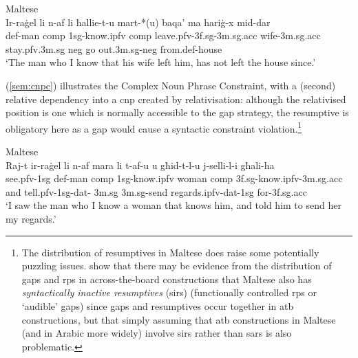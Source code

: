 \documentclass[output=paper,hidelinks]{langscibook}
\begin{document}
\ea \label{wco} Maltese  \citep[19]{CamSad11:LFG} \\
\gll
Ir-ra\.{g}el
       li              n-af               li
ħallie-t-u                  mart-*(u) baqa'        ma     hari\.{g}-x
mid-dar  \\
{\sc def-}man {\sc comp} {\sc 1sg}-know.{\sc ipfv}  {\sc comp}    leave.{\sc pfv}-{\sc 3f.sg-3m.sg.acc}
wife-{\sc 3m.sg.acc}  stay.{\sc pfv}.{\sc 3m.sg} {\sc neg} {go out}.{\sc 3m.sg}-{\sc neg} from.{\sc def}-house\\
\glt `The man who I know that his wife left him, has not left the house since.'
\z





(\ref{sem:cnpc}) illustrates the
Complex Noun Phrase Constraint, with a (second) relative dependency into a {\sc
  cnp} created by relativisation: although the relativised position is
one which is normally accessible to the gap strategy, the resumptive
is obligatory here as a gap would cause a syntactic constraint
violation.\footnote{The distribution of resumptives in Maltese does raise some potentially puzzling issues. \citet{CamSad11:LFG} show that there may be evidence from the distribution of gaps and {\sc rp}s in across-the-board constructions that Maltese also has {\em syntactically inactive resumptives} ({\sc sir}s) (functionally controlled {\sc rp}s or `audible' gaps)  since gaps and resumptives occur together in {\sc atb} constructions, but that simply assuming that {\sc atb} constructions in Maltese (and in Arabic more widely) involve {\sc sir}s rather than {\sc sar}s is also problematic.}




\ea
\label{sem:cnpc} Maltese \citep[120]{CamSad11:LFG}\\
\gll Raj-t ir-ra\.{g}el              li              n-af
mara        li               t-af-u u  għid-t-l-u                                j-selli-l-i                                       għali-ha\\
see.{\sc pfv}-{\sc 1sg}    {\sc def}-man  {\sc comp}  {\sc 1sg}-know.{\sc ipfv}   woman
{\sc comp}
{\sc 3f.sg}-know.{\sc ipfv}-{\sc 3m.sg.acc} and  tell.{\sc pfv}-{\sc 1sg}-{\sc dat}-{\sc
3m.sg}  {\sc 3m.sg}-{send regards.{\sc ipfv}}-{\sc dat}-{\sc 1sg}   for-{\sc 3f.sg.acc} \\
\glt `I saw the man who I know a woman that knows him, and told him to send her my regards.'
\z
\end{document}
